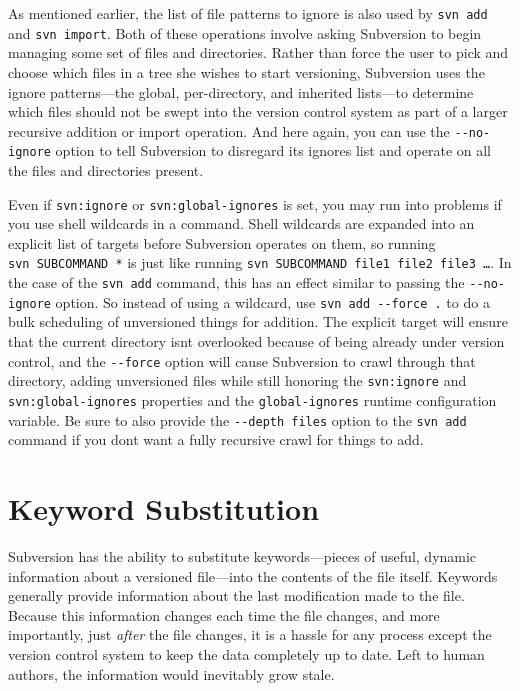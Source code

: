 As mentioned earlier, the list of file patterns to ignore is also used
by \texttt{svn\ add} and \texttt{svn\ import}. Both of these operations
involve asking Subversion to begin managing some set of files and
directories. Rather than force the user to pick and choose which files
in a tree she wishes to start versioning, Subversion uses the ignore
patterns---the global, per-directory, and inherited lists---to determine
which files should not be swept into the version control system as part
of a larger recursive addition or import operation. And here again, you
can use the \texttt{-\/-no-ignore} option to tell Subversion to
disregard its ignores list and operate on all the files and directories
present.

Even if \texttt{svn:ignore} or \texttt{svn:global-ignores} is set, you
may run into problems if you use shell wildcards in a command. Shell
wildcards are expanded into an explicit list of targets before
Subversion operates on them, so running \texttt{svn\ SUBCOMMAND\ *} is
just like running \texttt{svn\ SUBCOMMAND\ file1\ file2\ file3\ …}. In
the case of the \texttt{svn\ add} command, this has an effect similar to
passing the \texttt{-\/-no-ignore} option. So instead of using a
wildcard, use \texttt{svn\ add\ -\/-force\ .} to do a bulk scheduling of
unversioned things for addition. The explicit target will ensure that
the current directory isn\textquotesingle t overlooked because of being
already under version control, and the \texttt{-\/-force} option will
cause Subversion to crawl through that directory, adding unversioned
files while still honoring the \texttt{svn:ignore} and
\texttt{svn:global-ignores} properties and the \texttt{global-ignores}
runtime configuration variable. Be sure to also provide the
\texttt{-\/-depth\ files} option to the \texttt{svn\ add} command if you
don\textquotesingle t want a fully recursive crawl for things to add.

\section{Keyword
Substitution}\label{svn.advanced.props.special.keywords}

Subversion has the ability to substitute keywords---pieces of useful,
dynamic information about a versioned file---into the contents of the
file itself. Keywords generally provide information about the last
modification made to the file. Because this information changes each
time the file changes, and more importantly, just \emph{after} the file
changes, it is a hassle for any process except the version control
system to keep the data completely up to date. Left to human authors,
the information would inevitably grow stale.

